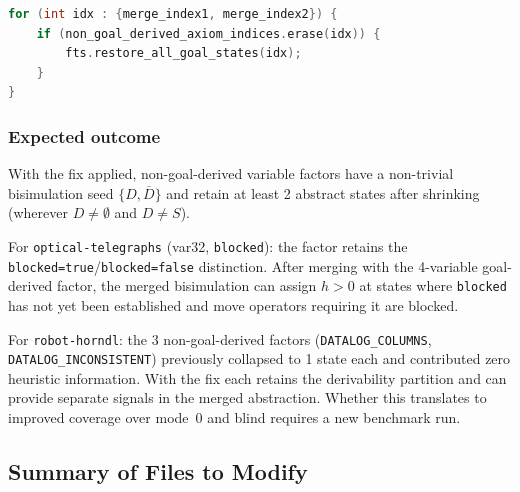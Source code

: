 \documentclass[11pt,a4paper]{article}
\begin{document}
\begin{enumerate}
\begin{lstlisting}[language=C++]
for (int idx : {merge_index1, merge_index2}) {
    if (non_goal_derived_axiom_indices.erase(idx)) {
        fts.restore_all_goal_states(idx);
    }
}
    \end{lstlisting}

    \subsubsection*{Expected outcome}

    With the fix applied, non-goal-derived variable factors have a non-trivial
    bisimulation seed $\{D, \overline{D}\}$ and retain at least 2 abstract
    states after shrinking (wherever $D \neq \emptyset$ and $D \neq S$).

    For \texttt{optical-telegraphs} (var32, \texttt{blocked}): the factor
    retains the \texttt{blocked=true}/\texttt{blocked=false} distinction.
    After merging with the 4-variable goal-derived factor, the merged
    bisimulation can assign $h > 0$ at states where \texttt{blocked} has not
    yet been established and move operators requiring it are blocked.

    For \texttt{robot-horndl}: the 3 non-goal-derived factors (\texttt{DATALOG\_COLUMNS},
    \texttt{DATALOG\_INCONSISTENT}) previously collapsed to 1 state each and
    contributed zero heuristic information.  With the fix each retains the
    derivability partition and can provide separate signals in the merged
    abstraction.  Whether this translates to improved coverage over mode~0 and
    blind requires a new benchmark run.

\end{enumerate}

\subsection{Summary of Files to Modify}
\end{document}
